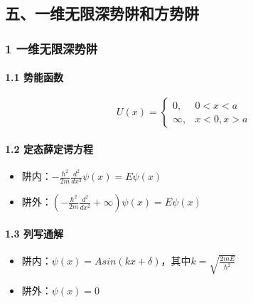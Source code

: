 \documentclass[UTF8,twocolumn]{ctexart}
\providecommand{\tightlist}{%
  \setlength{\itemsep}{0pt}\setlength{\parskip}{0pt}}
\let\oldparagraph\paragraph
\renewcommand{\paragraph}[1]{\oldparagraph{#1}\mbox{}}
\begin{document}
\hypertarget{ux4e94ux4e00ux7ef4ux65e0ux9650ux6df1ux52bfux9631ux548cux65b9ux52bfux9631}{%
\subsection{五、一维无限深势阱和方势阱}\label{ux4e94ux4e00ux7ef4ux65e0ux9650ux6df1ux52bfux9631ux548cux65b9ux52bfux9631}}

\hypertarget{ux4e00ux7ef4ux65e0ux9650ux6df1ux52bfux9631}{%
\subsubsection{1
一维无限深势阱}\label{ux4e00ux7ef4ux65e0ux9650ux6df1ux52bfux9631}}

\hypertarget{ux52bfux80fdux51fdux6570}{%
\paragraph{{ }1.1 势能函数}\label{ux52bfux80fdux51fdux6570}}

\[U(x)=\begin{cases} 
        0, & 0<x<a\\
        \infty, & x<0,x>a
\end{cases}\]

\hypertarget{ux5b9aux6001ux859bux5b9aux8c14ux65b9ux7a0b-2}{%
\paragraph{{ }1.2
定态薛定谔方程}\label{ux5b9aux6001ux859bux5b9aux8c14ux65b9ux7a0b-2}}

\begin{itemize}
\tightlist
\item
  阱内：\(-\frac{\hbar^2}{2m}\frac{d^2}{dx^2}\psi(x)=E\psi(x)\)
\item
  阱外：\((-\frac{\hbar^2}{2m}\frac{d^2}{dx^2}+\infty)\psi(x)=E\psi(x)\)
\end{itemize}

\hypertarget{ux5217ux5199ux901aux89e3}{%
\paragraph{{ }1.3 列写通解}\label{ux5217ux5199ux901aux89e3}}

\begin{itemize}
\tightlist
\item
  阱内：\(\psi(x)=Asin(kx+\delta)\)，其中\(k=\sqrt{\frac{2mE}{\hbar^2}}\)
\item
  阱外：\(\psi(x)=0\)
\end{itemize}
\end{document}
